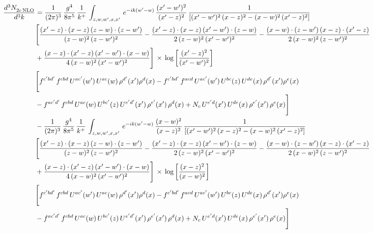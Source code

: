 \documentclass[9pt]{article}
\numberwithin{equation}{section}
\begin{document}
\begin{align}
    \frac{d^{3}N_{2c\,\rm NLO}^{\rm}}{d^{3}k}  & =  \frac{1}{(2\pi)^{3}}\, \frac{g^{4}}{8\pi^{5}}\,\frac{1}{k^{+}}\,\int_{z,w,w^{\prime},x,x'}\, e^{-ik(w^{\prime}-w)}\,\frac{(x'-w')^{2}}{(x'-z)^{2}}\, \frac{1}{\left[(x'-w')^{2}\, (x-z)^{2} - (x-w)^{2}\, (x'-z)^{2}\right]} \notag \\ & \Bigg[\frac{(x'-z)\cdot (x-z)\, (z-w)\cdot (z-w')}{(z-w)^{2}\, (z-w')^{2}}-\frac{(x'-z)\cdot (x-z)\, (x'-w')\cdot (z-w)}{2\, (z-w)^{2}\, (x'-w')^{2}} -\frac{(x-w)\cdot (z-w')\, (x-z)\cdot (x'-z)}{2\, (x-w)^{2}\, (z-w')^{2}}\notag \\ & +\frac{(x-z)\cdot (x'-z)\, (x'-w')\cdot (x-w)}{4\, (x-w)^{2}\, (x'-w')^{2}}\Bigg]\,\times\, \log{\left[\frac{(x'-z)^{2}}{(x'-w')^{2}}\right]} \notag \\ &  \Bigg[f^{c'bd'}\,f^{cbd}\, U^{ac'}(w')\,U^{ac}(w)\,\rho^{d'}(x')\rho^{d}(x)- f^{c'bd'}\,f^{acd}\,U^{ac'}(w')\,U^{bc}(z)\,U^{de}(x)\,\rho^{d'}(x')\rho^{e}(x) \notag \\ & -f^{ac'd'}\,f^{cbd}\,U^{ac}(w)\,U^{bc'}(z)\,U^{e'd'}(x')\,\rho^{e'}(x')\,\rho^{d}(x) +N_{c}\,U^{e'd}(x')\,U^{de}(x)\,\rho^{e'}(x')\,\rho^{e}(x)\Bigg] \notag \\
& -\frac{1}{(2\pi)^{3}}\, \frac{g^{4}}{8\pi^{5}}\,\frac{1}{k^{+}}\,\int_{z,w,w^{\prime},x,x'}\, e^{-ik(w^{\prime}-w)}\,\frac{(x-w)^{2}}{(x-z)^{2}}\, \frac{1}{\left[(x'-w')^{2}\, (x-z)^{2} - (x-w)^{2}\, (x'-z)^{2}\right]} \notag \\ & \Bigg[\frac{(x'-z)\cdot (x-z)\, (z-w)\cdot (z-w')}{(z-w)^{2}\, (z-w')^{2}}-\frac{(x'-z)\cdot (x-z)\, (x'-w')\cdot (z-w)}{2\, (z-w)^{2}\, (x'-w')^{2}} -\frac{(x-w)\cdot (z-w')\, (x-z)\cdot (x'-z)}{2\, (x-w)^{2}\, (z-w')^{2}}\notag \\ & +\frac{(x-z)\cdot (x'-z)\, (x'-w')\cdot (x-w)}{4\, (x-w)^{2}\, (x'-w')^{2}}\Bigg]\,\times\, \log{\left[\frac{(x-z)^{2}}{(x-w)^{2}}\right]} \notag \\ &  \Bigg[f^{c'bd'}\,f^{cbd}\, U^{ac'}(w')\,U^{ac}(w)\,\rho^{d'}(x')\rho^{d}(x)- f^{c'bd'}\,f^{acd}\,U^{ac'}(w')\,U^{bc}(z)\,U^{de}(x)\,\rho^{d'}(x')\rho^{e}(x) \notag \\ & -f^{ac'd'}\,f^{cbd}\,U^{ac}(w)\,U^{bc'}(z)\,U^{e'd'}(x')\,\rho^{e'}(x')\,\rho^{d}(x) +N_{c}\,U^{e'd}(x')\,U^{de}(x)\,\rho^{e'}(x')\,\rho^{e}(x)\Bigg]
\end{align}
\end{document}
